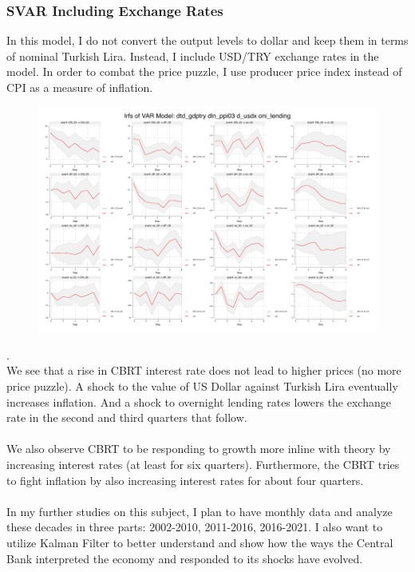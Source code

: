 \documentclass{article}
\begin{document}
\subsubsection{SVAR Including Exchange Rates}

    In this model, I do not convert the output levels to dollar and keep them in terms of nominal Turkish Lira. Instead, I include USD/TRY exchange rates in the model. In order to combat the price puzzle, I use producer price index instead of CPI as a measure of inflation.

\begin{figure}[H]
    \centering
    \includegraphics[width=\linewidth]{turkey_taylor/svar4_try.pdf}
\end{figure}
    {\tiny .}\\
    We see that a rise in CBRT interest rate does not lead to higher prices (no more price puzzle). A shock to the value of US Dollar against Turkish Lira eventually increases inflation. And a shock to overnight lending rates lowers the exchange rate in the second and third quarters that follow. 
    \\ \\
    We also observe CBRT to be responding to growth more inline with theory by increasing interest rates (at least for six quarters). Furthermore, the CBRT tries to fight inflation by also increasing interest rates for about four quarters.
    \\ \\
    In my further studies on this subject, I plan to have monthly data and analyze these decades in three parts: 2002-2010, 2011-2016, 2016-2021. I also want to utilize Kalman Filter to better understand and show how the ways the Central Bank interpreted the economy and responded to its shocks have evolved.
\end{document}
